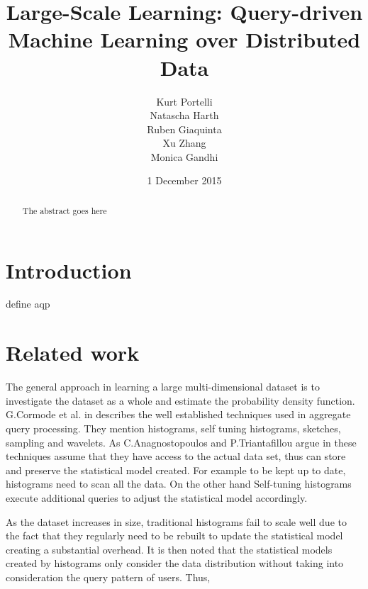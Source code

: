 \documentclass{lmproj}
\begin{document}
\title{Large-Scale Learning: Query-driven Machine Learning over Distributed Data}
\author{Kurt Portelli \\
        Natascha Harth \\
        Ruben Giaquinta \\
        Xu Zhang \\
        Monica Gandhi}
\date{1 December 2015}
\maketitle
\begin{abstract}

The abstract goes here

\end{abstract}
\educationalconsent
\tableofcontents
\chapter{Introduction}
\label{intro}
define aqp \cite{aggqueryprocessing}
\chapter{Related work}
\label{relatedWork}
The general approach in learning a large multi-dimensional dataset is to investigate the dataset as a whole and estimate the probability density function. G.Cormode et al. in \cite{Synopses} describes the well established techniques used in aggregate query processing. They mention histograms, self tuning histograms, sketches, sampling and wavelets. As C.Anagnostopoulos and P.Triantafillou argue in \cite{learningCount} these techniques assume that they have access to the actual data set, thus can store and preserve the statistical model created. For example to be kept up to date, histograms need to scan all the data. On the other hand Self-tuning histograms execute additional queries to adjust the statistical model accordingly.

As the dataset increases in size, traditional histograms fail to scale well due to the fact that they regularly need to be rebuilt to update the statistical model creating a substantial overhead. It is then noted that the statistical models created by histograms only consider the data distribution without taking into consideration the query pattern of users.\cite{learningCount} Thus, 
\end{document}
